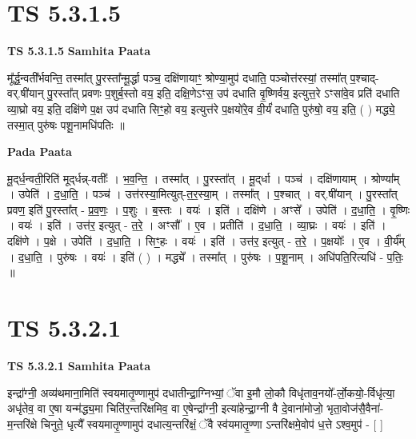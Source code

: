 \documentclass[17pt]{extarticle}
\begin{document}
\section*{ TS 5.3.1.5 }

\textbf{TS 5.3.1.5 } \newline
\textbf{Samhita Paata} \newline

मू᳚र्द्ध॒न्वती᳚र्भवन्ति॒ तस्मा᳚त् पु॒रस्ता᳚न्मू॒र्द्धा पञ्च॒ दक्षि॑णायाꣳ॒॒ श्रोण्या॒मुप॑ दधाति॒ पञ्चोत्त॑रस्यां॒ तस्मा᳚त् प॒श्चाद्-वर्.षी॑यान् पु॒रस्ता᳚त् प्रवणः प॒शुर्ब॒स्तो वय॒ इति॒ दक्षि॒णेऽꣳस॒ उप॑ दधाति वृ॒ष्णिर्वय॒ इत्युत्त॒रे ऽꣳसा॑वे॒व प्रति॑ दधाति व्या॒घ्रो वय॒ इति॒ दक्षि॑णे प॒क्ष उप॑ दधाति सिꣳ॒॒हो वय॒ इत्युत्त॑रे प॒क्षयो॑रे॒व वी॒र्यं॑ दधाति॒ पुरु॑षो॒ वय॒ इति॒ ( ) मद्ध्ये॒ तस्मा॒त् पुरु॑षः पशू॒नामधि॑पतिः ॥ \newline

\textbf{Pada Paata} \newline

मू॒द्‌र्ध॒न्वती॒रिति॑ मूद्‌र्धन्न्-वतीः᳚ । भ॒व॒न्ति॒ । तस्मा᳚त् । पु॒रस्ता᳚त् । मू॒द्‌र्धा । पञ्च॑ । दक्षि॑णायाम् । श्रोण्या᳚म् । उपेति॑ । द॒धा॒ति॒ । पञ्च॑ । उत्त॑रस्या॒मित्युत्-त॒र॒स्या॒म् । तस्मा᳚त् । प॒श्चात् । वर्.षी॑यान् । पु॒रस्ता᳚त् प्रवण॒ इति॑ पु॒रस्ता᳚त् - प्र॒व॒णः॒ । प॒शुः । ब॒स्तः । वयः॑ । इति॑ । दक्षि॑णे । अꣳसे᳚ । उपेति॑ । द॒धा॒ति॒ । वृ॒ष्णिः । वयः॑ । इति॑ । उत्त॑र॒ इत्युत् - त॒रे॒ । अꣳसौ᳚ । ए॒व । प्रतीति॑ । द॒धा॒ति॒ । व्या॒घ्रः । वयः॑ । इति॑ । दक्षि॑णे । प॒क्षे । उपेति॑ । द॒धा॒ति॒ । सिꣳ॒॒हः । वयः॑ । इति॑ । उत्त॑र॒ इत्युत् - त॒रे॒ । प॒क्षयोः᳚ । ए॒व । वी॒र्य᳚म् । द॒धा॒ति॒ । पुरु॑षः । वयः॑ । इति॑ ( ) । मद्ध्ये᳚ । तस्मा᳚त् । पुरु॑षः । प॒शू॒नाम् । अधि॑पति॒रित्यधि॑ - प॒तिः॒ ॥  \newline




\section*{ TS 5.3.2.1 }

\textbf{TS 5.3.2.1 } \newline
\textbf{Samhita Paata} \newline

इन्द्रा᳚ग्नी॒ अव्य॑थमाना॒मिति॑ स्वयमातृ॒ण्णामुप॑ दधातीन्द्रा॒ग्निभ्यां॒ ॅवा इ॒मौ लो॒कौ विधृ॑ताव॒नयो᳚-र्लो॒कयो॒-र्विधृ॑त्या॒ अधृ॑तेव॒ वा ए॒षा यन्म॑द्ध्य॒मा चिति॑र॒न्तरि॑क्षमिव॒ वा ए॒षेन्द्रा᳚ग्नी॒ इत्या॑हेन्द्रा॒ग्नी वै दे॒वाना॑मोजो॒ भृता॒वोज॑सै॒वैना॑-म॒न्तरि॑क्षे चिनुते॒ धृत्यै᳚ स्वयमातृ॒ण्णामुप॑ दधात्य॒न्तरि॑क्षं॒ ॅवै स्व॑यमातृ॒ण्णा ऽन्तरि॑क्षमे॒वोप॑ ध॒त्ते ऽश्व॒मुप॑ - [  ] \newline
\end{document}
